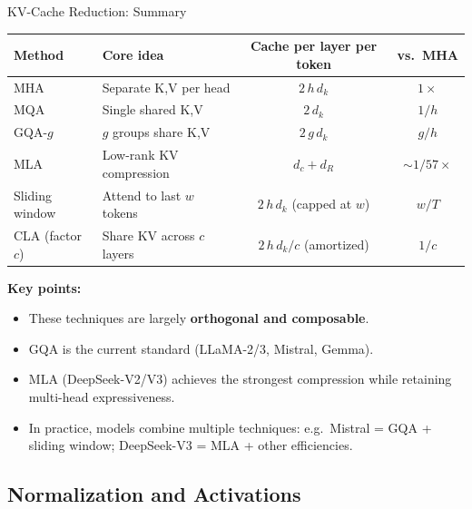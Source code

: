 \begin{frame}{KV-Cache Reduction: Summary}

  \begin{center}
  {\small
  \begin{tabular}{llcc}
    \toprule
    \textbf{Method} & \textbf{Core idea} & \textbf{Cache per layer per token} & \textbf{vs.\ MHA} \\
    \midrule
    MHA & Separate K,V per head & $2\, h\, d_k$ & $1\times$ \\
    MQA & Single shared K,V & $2\, d_k$ & $1/h$ \\
    GQA-$g$ & $g$ groups share K,V & $2\, g\, d_k$ & $g/h$ \\
    MLA & Low-rank KV compression & $d_c + d_R$ & $\sim 1/57\times$ \\
    Sliding window & Attend to last $w$ tokens & $2\, h\, d_k$ (capped at $w$) & $w / T$ \\
    CLA (factor $c$) & Share KV across $c$ layers & $2\, h\, d_k / c$ (amortized) & $1/c$ \\
    \bottomrule
  \end{tabular}
  }
  \end{center}

  \vspace{0.3em}
  \textbf{Key points:}
  \begin{itemize}
    \item These techniques are largely \textbf{orthogonal and composable}.
    \item GQA is the current standard (LLaMA-2/3, Mistral, Gemma).
    \item MLA (DeepSeek-V2/V3) achieves the strongest compression while retaining multi-head expressiveness.
    \item In practice, models combine multiple techniques:
      e.g.\ Mistral = GQA + sliding window; DeepSeek-V3 = MLA + other efficiencies.
  \end{itemize}

\end{frame}

\subsection{Normalization and Activations}

